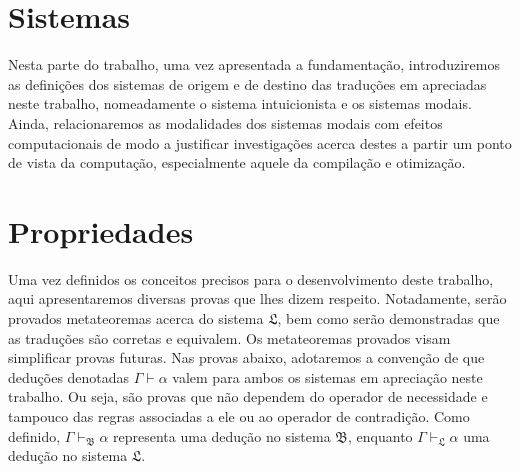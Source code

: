     \tableofcontents

    
    
    

    \chapter{Sistemas}

        Nesta parte do trabalho, uma vez apresentada a fundamentação, introduziremos as definições dos sistemas de origem e de destino das traduções em apreciadas neste trabalho, nomeadamente o sistema intuicionista e os sistemas modais.
        Ainda, relacionaremos as modalidades dos sistemas modais com efeitos computacionais de modo a justificar investigações acerca destes a partir um ponto de vista da computação, especialmente aquele da compilação e otimização.

        
        
        

    \chapter{Propriedades}
        Uma vez definidos os conceitos precisos para o desenvolvimento deste trabalho, aqui apresentaremos diversas provas que lhes dizem respeito.
        Notadamente, serão provados metateoremas acerca do sistema $\mathfrak{L}$, bem como serão demonstradas que as traduções são corretas e equivalem.
        Os metateoremas provados visam simplificar provas futuras.
        Nas provas abaixo, adotaremos a convenção de que deduções denotadas $\Gamma\vdash\alpha$ valem para ambos os sistemas em apreciação neste trabalho.
        Ou seja, são provas que não dependem do operador de necessidade e tampouco das regras associadas a ele ou ao operador de contradição.
        Como definido, $\Gamma\vdash_\mathfrak{B}\alpha$ representa uma dedução no sistema $\mathfrak{B}$, enquanto $\Gamma\vdash_\mathfrak{L}\alpha$ uma dedução no sistema $\mathfrak{L}$.

        
        
        
        
        

    
    


